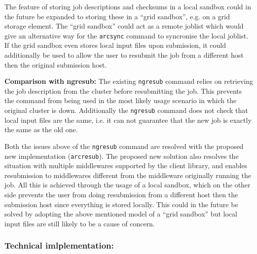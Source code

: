 \documentclass[12pt,oneside,a4paper,english]{article}
\begin{document}
The feature of storing job descriptions and checksums in a local sandbox could in the future be expanded to storing these in a ``grid sandbox'', e.g. on a grid storage element. The ``grid sandbox'' could act as a remote joblist which would give an alternative way for the \texttt{arcsync} command to syncronise the local joblist. If the grid sandbox even stores local input files upon submission, it could additionally be used to allow the user to resubmit the job from a different host then the original submission host.

{\bf Comparison with ngresub:} The existing \texttt{ngresub} command relies on retrieving the job description from the cluster before resubmitting the job. This prevents the command from being used in the most likely usage scenario in which the original cluster is down. Additionally the \texttt{ngresub} command does not check that local input files are the same, i.e. it can not guarantee that the new job is exactly the same as the old one. 

Both the issues above of the \texttt{ngresub} command are resolved with the proposed new implementation (\texttt{arcresub}). The proposed new solution also resolves the situation with multiple middlewares supported by the client library, and enables resubmission to middlewares different from the middleware originally running the job. All this is achieved through the usage of a local sandbox, which on the other side prevents the user from doing resubmission from a different host then the submission host since everything is stored locally. This could in the future be solved by adopting the above mentioned model of a ``grid sandbox'' but local input files are still likely to be a cause of concern.     

\subsubsection*{Technical imlplementation:}

\end{document}
